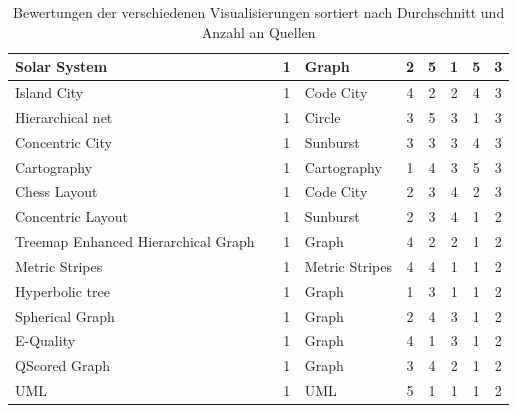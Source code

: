 \begin{table}[htbp]
{\begin{tabularx}{1.4\textwidth}{|X|X|c|X|c|c|c|c|c|}
        Solar System & \cite{solarSystem} & 1 & Graph & 2 & 5 & 1 & 5 & 3 \\ \hline
        Island City & \cite{staticSurvey} & 1 & Code City & 4 & 2 & 2 & 4 & 3 \\ \hline
        Hierarchical net & \cite{staticSurvey} & 1 & Circle & 3 & 5 & 3 & 1 & 3 \\ \hline
        Concentric City & \cite{EvoSpaces} & 1 & Sunburst & 3 & 3 & 3 & 4 & 3 \\ \hline
        Cartography & \cite{softwareCartography} & 1 & Cartography & 1 & 4 & 3 & 5 & 3 \\ \hline
        Chess Layout & \cite{visbasedlarge} & 1 & Code City & 2 & 3 & 4 & 2 & 3 \\ \hline
        Concentric Layout & \cite{visbasedlarge} & 1 & Sunburst & 2 & 3 & 4 & 1 & 2 \\ \hline
        Treemap Enhanced Hierarchical Graph & \cite{exploringRelations} & 1 & Graph & 4 & 2 & 2 & 1 & 2 \\ \hline
        Metric Stripes & \cite{visSoftwareMetricsBook} & 1 & Metric Stripes & 4 & 4 & 1 & 1 & 2 \\ \hline
        Hyperbolic tree & \cite{visualizationEvolution} & 1 & Graph & 1 & 3 & 1 & 1 & 2 \\ \hline
        Spherical Graph & \cite{metricsBased3DVisualization} & 1 & Graph & 2 & 4 & 3 & 1 & 2 \\ \hline
        E-Quality & \cite{eQuality} & 1 & Graph & 4 & 1 & 3 & 1 & 2 \\ \hline
        QScored Graph & \cite{QScored} & 1 & Graph & 3 & 4 & 2 & 1 & 2 \\ \hline
        UML & \cite{and_2025} & 1 & UML & 5 & 1 & 1 & 1 & 2 \\
 \hline
 \end{tabularx}
 }
 \caption[Bewertungen der verschiedenen Visualisierungen]{Bewertungen der verschiedenen Visualisierungen sortiert nach Durchschnitt und Anzahl an Quellen}
 \label{tab:visEval_full}
\end{table}